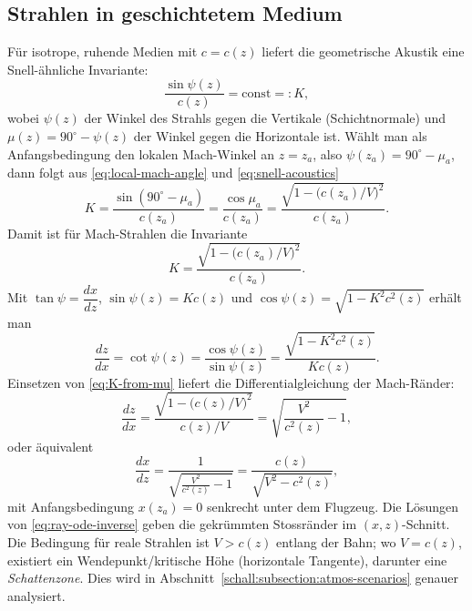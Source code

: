 \subsection{Strahlen in geschichtetem Medium}
Für isotrope, ruhende Medien mit $c=c(z)$ liefert die geometrische
Akustik eine Snell-ähnliche Invariante:
\begin{equation}
  \frac{\sin\psi(z)}{c(z)} = \text{const} =: K ,
  \label{eq:snell-acoustics}
\end{equation}
wobei $\psi(z)$ der Winkel des Strahls gegen die Vertikale
(Schichtnormale) und $\mu(z)=90^\circ-\psi(z)$ der Winkel gegen
die Horizontale ist.
Wählt man als Anfangsbedingung den lokalen Mach-Winkel an $z=z_a$,
also $\psi(z_a)=90^\circ-\mu_a$, dann folgt aus
\eqref{eq:local-mach-angle} und \eqref{eq:snell-acoustics}
\[
  K = \frac{\sin(90^\circ-\mu_a)}{c(z_a)} =
  \frac{\cos\mu_a}{c(z_a)} =
  \frac{\sqrt{1-\bigl(c(z_a)/V\bigr)^2}}{c(z_a)}.
\]
Damit ist für Mach-Strahlen die Invariante
\begin{equation}
  K = \frac{\sqrt{1-\bigl(c(z_a)/V\bigr)^2}}{c(z_a)}.
  \label{eq:K-from-mu}
\end{equation}
Mit $\tan\psi = \dfrac{dx}{dz}$, $\sin\psi(z) = Kc(z)$ und
$\cos\psi(z) = \sqrt{1 - K^2 c^2(z)}$ erhält man
\begin{equation*}
  \frac{dz}{dx} = \cot\psi(z) =
  \frac{\cos\psi(z)}{\sin\psi(z)} =
  \frac{\sqrt{1 - K^2 c^2(z)}}{Kc(z)}.
\end{equation*}
Einsetzen von \eqref{eq:K-from-mu} liefert die
Differentialgleichung der Mach-Ränder:
\[
  \frac{dz}{dx} = \frac{\sqrt{1 - \bigl(c(z)/V\bigr)^2}}{c(z)/V}
  = \sqrt{\frac{V^2}{c^2(z)} - 1},
\]
oder äquivalent
\begin{equation}
  \frac{dx}{dz} = \frac{1}{\sqrt{\frac{V^2}{c^2(z)} - 1}} =
  \frac{c(z)}{\sqrt{V^2 - c^2(z)}},
  \label{eq:ray-ode-inverse}
\end{equation}
mit Anfangsbedingung $x(z_a)=0$ senkrecht unter dem Flugzeug.
Die Lösungen von \eqref{eq:ray-ode-inverse} geben die gekrümmten Stossränder
im $(x,z)$-Schnitt.
Die Bedingung für reale Strahlen ist $V>c(z)$
entlang der Bahn; wo $V=c(z)$, existiert ein Wendepunkt/kritische Höhe
(horizontale Tangente), darunter eine \emph{Schattenzone}.
%
Dies wird in Abschnitt~\ref{schall:subsection:atmos-scenarios} genauer analysiert.

